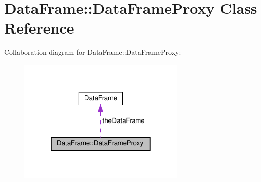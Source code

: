 \hypertarget{classDataFrame_1_1DataFrameProxy}{}\section{Data\+Frame\+:\+:Data\+Frame\+Proxy Class Reference}
\label{classDataFrame_1_1DataFrameProxy}


Collaboration diagram for Data\+Frame\+:\+:Data\+Frame\+Proxy\+:\nopagebreak
\begin{figure}[H]
\begin{center}
\leavevmode
\includegraphics[width=226pt]{classDataFrame_1_1DataFrameProxy__coll__graph}
\end{center}
\end{figure}
